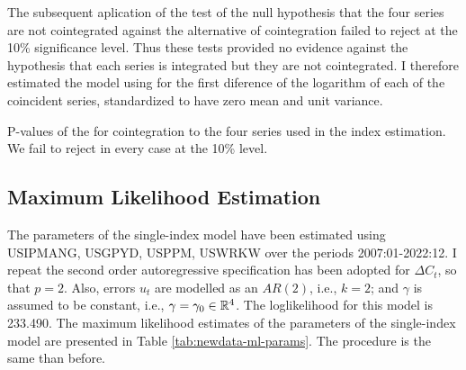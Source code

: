 The subsequent aplication of the  test of the null hypothesis that the four series are not cointegrated against the alternative of cointegration failed to reject at the 10\% significance level. Thus these tests provided no evidence against the hypothesis that each series is integrated but they are not cointegrated. I therefore estimated the model using for the first diference of the logarithm of each of the coincident series, standardized to have zero mean and unit variance.

\begin{table}[h!]
	\centering\small
	\captionsetup{width=0.6\textwidth, font=small}
	\caption{P-values of the \protect\cite{engle1987co} for cointegration to the four series used in the index estimation. We fail to reject in every case at the 10\% level.}
	
\end{table}

\subsection{Maximum Likelihood Estimation}

The parameters of the single-index model have been estimated using USIPMANG, USGPYD, USPPM, USWRKW over the periods 2007:01-2022:12. I repeat the second order autoregressive  specification  has been adopted for $\Delta C_t$, so that $p=2$. Also, errors $u_t$ are modelled as an $AR(2)$, i.e., $k=2$; and $\gamma$ is assumed to be constant, i.e., $\gamma = \gamma_0\in\mathbb{R}^4$. The loglikelihood for this model is 233.490. The maximum likelihood estimates of the parameters of the single-index model are presented in Table \ref{tab:newdata-ml-params}. The procedure is the same than before.



